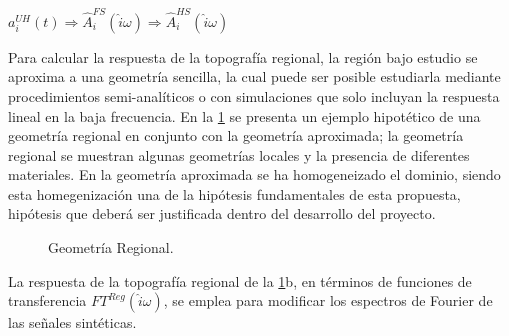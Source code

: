 \documentclass[spanish,letterpaper,12pt,twoside,openany]{article}
\begin{document}
	$a_{i}^{UH}\left( t \right) \Rightarrow \widehat{A}^{FS}_{i} \left( \hat{i} \omega \right) \Rightarrow \widehat{A}^{HS}_{i} \left( \hat{i} \omega \right)$

Para calcular la respuesta de la topografía regional, la región bajo estudio se aproxima a una geometría sencilla, la cual puede ser posible estudiarla mediante procedimientos semi-analíticos o con simulaciones que solo incluyan la respuesta lineal en la baja frecuencia. En la \cref{fig:geolocreg} se presenta un ejemplo hipotético de una geometría regional en conjunto con la geometría aproximada; la geometría regional se muestran algunas geometrías locales y la presencia de diferentes materiales. En la geometría aproximada se ha homogeneizado el dominio, siendo esta homegenización una de la hipótesis fundamentales de esta propuesta, hipótesis que deberá ser justificada dentro del desarrollo del proyecto.
%
\begin{figure}[H]
	\centering
	\hspace{.25 cm}
	\vspace{-.5 cm}
    \caption{Geometría Regional.}
    \label{fig:geolocreg}
    \vspace{-1 cm}
\end{figure}
%
La respuesta de la topografía regional de la \cref{fig:geolocreg}b, en términos de funciones de transferencia $FT^{Reg} \left(\hat{i} \omega \right)$, se emplea para modificar los espectros de Fourier de las señales sintéticas.
\end{document}
